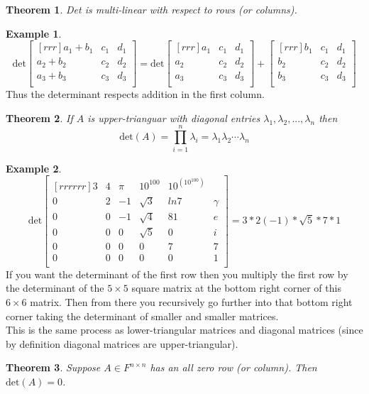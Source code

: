\documentclass{report}
\theoremstyle{plain}
\newtheorem*{thrm}{Theorem}
\theoremstyle{definition}
\newtheorem*{ex}{Example}
\theoremstyle{plain}
\begin{document}
\begin{thrm}
Det is multi-linear with respect to rows (or columns).
\end{thrm}
\begin{ex}
\[ \mathrm{det}\begin{bmatrix}[rrr]a_1+b_1&c_1&d_1\\a_2+b_2&c_2&d_2\\a_3+b_3&c_3&d_3\\\end{bmatrix} = \mathrm{det}\begin{bmatrix}[rrr]a_1&c_1&d_1\\a_2&c_2&d_2\\a_3&c_3&d_3\\\end{bmatrix}+\begin{bmatrix}[rrr]b_1&c_1&d_1\\b_2&c_2&d_2\\b_3&c_3&d_3\\\end{bmatrix} \]
Thus the determinant respects addition in the first column.
\end{ex}
\begin{thrm}
If $A$ is upper-trianguar with diagonal entries $\lambda_1,\lambda_2,...,\lambda_n$ then
\[ \mathrm{det}(A)=\prod_{i=1}^n \lambda_i = \lambda_1 \lambda_2 \cdots \lambda_n \]
\end{thrm}
\begin{ex}
\[ \mathrm{det}\begin{bmatrix}[rrrrrr]3&4&\pi &10^{100} & 10^{(10^{100})}\\0&2&-1&\sqrt{3} & ln7&\gamma\\0&0&-1&\sqrt{4} & 81&e\\0&0&0&\sqrt{5}&0&i\\0&0&0&0&7&7\\0&0&0&0&0&1\\\end{bmatrix} = 3*2(-1)*\sqrt{5}*7*1 \]
If you want the determinant of the first row then you multiply the first row by the determinant of the $5\times 5$ square matrix at the bottom right corner of this $6 \times 6$ matrix. Then from there you recursively go further into that bottom right corner taking the determinant of smaller and smaller matrices.\\
This is the same process as lower-triangular matrices and diagonal matrices (since by definition diagonal matrices are upper-triangular).
\end{ex}
\begin{thrm}
Suppose $A\in F^{n\times n}$ has an all zero row (or column). Then $\mathrm{det}(A)=0$.
\end{thrm}
\end{document}
